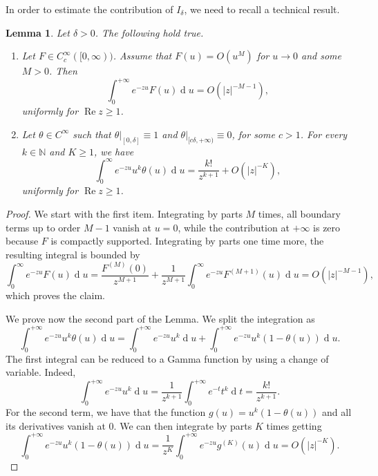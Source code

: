 \documentclass[12pt,a4paper,reqno]{amsart}
\newtheorem{lem}[thm]{Lemma}
\theoremstyle{definition}
\theoremstyle{definition}\newtheorem{defn}[thm]{Definition}
\begin{document}
    In order to estimate the contribution of $I_\delta$, we need to recall a technical result.
    \begin{lem}\label{lem: Gamma} Let $\delta>0$. The following hold true.
    \begin{enumerate}
        \item Let \(F\in C_c^\infty([0,\infty))\). Assume that $F(u)=O(u^M)$ for $u\to 0$ and some $M>0$. Then 
        \[
    \int_0^{+\infty} e^{-zu}F(u)\operatorname{d}\!u
    =
    O(|z|^{-M-1}),
    \]
    uniformly for $\operatorname{Re} z\geqslant 
    1$.
    \item 
        Let $\theta\in C^\infty$ such that $\theta|_{[0,\delta]}\equiv 1$ and $\theta|_{[c\delta,+\infty)}\equiv 0$, for some $c>1$. For every $k\in\mathbb N$ and $K\geqslant1$, we have
        \[\int_0^{\infty} e^{-zu}u^k\theta(u)\operatorname{d}\!u=\frac {k!}{z^{k+1}}+ O (|z|^{-K}),\]
        uniformly for $\operatorname{Re} z\geqslant1$.
    \end{enumerate}
    \end{lem}
    \begin{proof}
        We start with the first item. %
        Integrating by parts \(M\) times,
    all boundary terms up to order \(M-1\) vanish at \(u=0\), while the
    contribution at \(+\infty\) is zero because \(F\) is compactly
    supported. Integrating by parts one time more, the resulting integral is bounded by
    \[\int_0^\infty e^{-zu}F(u)\operatorname{d}\!u=\frac{F^{(M)}(0)}{z^{M+1}}+\frac1{z^{M+1}}\int_0^\infty e^{-zu}F^{(M+1)}(u)\operatorname{d}\!u=O(|z|^{-M-1}),\]
    which proves the claim.
        
        We prove now the second part of the Lemma. We split the integration as
        \[\int_0^{+\infty} e^{-zu}u^k\theta(u)\operatorname{d}\!u= \int_0^{+\infty} e^{-zu}u^k\operatorname{d}\!u+\int_0^{+\infty} e^{-zu}u^k(1-\theta(u))\operatorname{d}\!u.\]
        The first integral can be reduced to a Gamma function by using a change of variable. Indeed,
        \[ 
        \int_0^{+\infty} e^{-zu}u^k\operatorname{d}\!u=\frac 1{z^{k+1}}\int_0^{+\infty} e^{-t}t^k\operatorname{d}\!t=\frac {k!}{z^{k+1}}.
        \]
        For the second term, we have that the function $g(u)=u^k(1-\theta(u))$ and all its derivatives vanish at $0$. We can then integrate by parts $K$ times getting
        \[
        \int_0^{+\infty} e^{-zu}u^k(1-\theta(u))\operatorname{d}\!u=\frac 1{z^K}\int_0^{+\infty} e^{-zu}g^{(K)}(u)\operatorname{d}\!u=O(|z|^{-K}).\]
    \end{proof}
\end{document}
